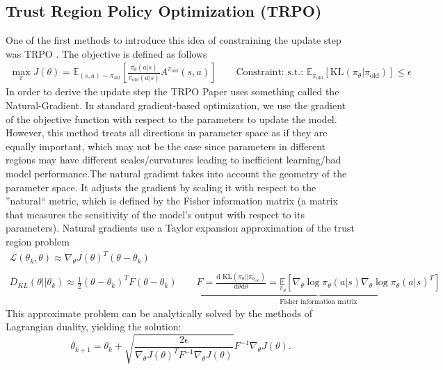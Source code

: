 \subsection{Trust Region Policy Optimization (TRPO)}
 One of the first methods to introduce this idea of constraining the update step was TRPO  \cite{schulman2017trustregionpolicyoptimization}. The objective is defined as follows 
 \begin{align*}
     \max\limits_{\pi} J(\theta) = \mathbb{E}_{(s,a) \sim \pi_{\text{old}}} 
     \left[\frac{\pi_{\theta}(a|s)}{\pi_{\text{old}}(a|s)} A^{\pi_{\text{old}}}(s,a)\right] \qquad
     \text{Constraint: s.t.: } \mathbb{E}_{\pi_{\text{old}}}\left[\text{KL}(\pi_{\theta}|\pi_{\text{old}})\right] \leq \epsilon
 \end{align*}
In order to derive the update step the TRPO Paper uses something called the Natural-Gradient.
In standard gradient-based optimization, we use the gradient of the objective function with respect to the parameters to update the model. However, this method treats all
directions in parameter space as if they are equally important, which may not be the case since parameters in different 
regions may have different scales/curvatures leading to inefficient learning/bad model performance.\newline The natural gradient 
takes into account the geometry of the parameter space. It adjusts the gradient by scaling it with respect to the ''natural``
metric, which is defined by the Fisher information matrix (a matrix that measures the sensitivity of the model's output with 
respect to its parameters).\newline
Natural gradients use a Taylor expansion approximation of the trust region problem
\begin{gather*}
{\mathcal L}(\theta_k, \theta) \approx \nabla_\theta J(\theta)^T (\theta - \theta_k) \\  \\
\bar{D}_{KL}(\theta || \theta_k)  \approx \frac{1}{2} (\theta - \theta_k)^T F (\theta - \theta_k) \qquad \underbrace{F =\frac{\text{d KL}
(\pi_\theta||\pi_{\theta_{\text{old}}})}{\text{d}\theta\text{d}\theta} =\underset{\pi_\theta}{\mathbb{E}}[\nabla_\theta \log{\pi_\theta(a|s)}
{\nabla_\theta \log{\pi_\theta(a|s)}}^T]}_{\text{Fisher information matrix}}
\end{gather*}
This approximate problem can be analytically solved by the methods of Lagrangian duality, yielding the solution:
$$\theta_{k+1} = \theta_k + \sqrt{\frac{2 \epsilon}{{\nabla_\theta J(\theta)}^T F^{-1} \nabla_\theta J(\theta)}} F^{-1} \nabla_\theta J(\theta).$$
